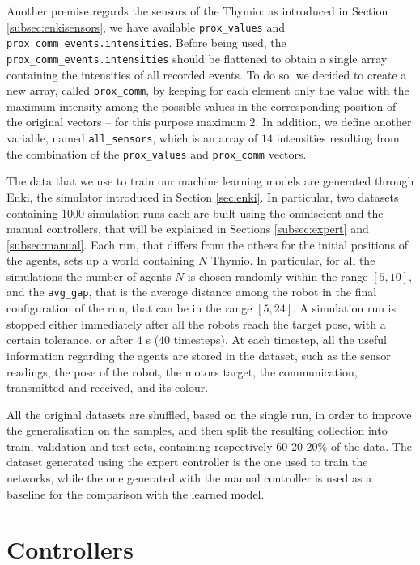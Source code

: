 Another premise regards the sensors of the Thymio: as introduced in Section 
\ref{subsec:enkisensors}, we have available \texttt{prox\_values} and 
\texttt{prox\_comm\_events.intensities}. Before being used, the 
\texttt{prox\_comm\_events.intensities} should be flattened to obtain a single 
array containing the intensities of all recorded events. 
To do so, we decided to create a new array, called \texttt{prox\_comm}, by 
keeping for each element only the value with the maximum intensity among the 
possible values in the corresponding position of the original vectors – for this 
purpose maximum $2$.
In addition, we define another variable, named \texttt{all\_sensors}, which is an 
array of $14$ intensities resulting from the combination of the 
\texttt{prox\_values} and \texttt{prox\_comm} vectors.

The data that we use to train our machine learning models are generated through 
Enki, the simulator introduced in Section \ref{sec:enki}.
In particular, two datasets containing $1000$ simulation runs each are built using 
the omniscient and the manual controllers, that will be explained in Sections 
\ref{subsec:expert} and \ref{subsec:manual}. 
Each run, that differs from the others for the initial positions of the agents, sets up 
a world containing $N$ Thymio. 
In particular, for all the simulations the number of agents $N$ is chosen randomly 
within the range $[5, 10]$, and the \texttt{avg\_gap}, that is the average distance 
among the robot in the final configuration of the run, that can be in the range 
$[5, 24]$.
A simulation run is stopped either immediately after all the robots reach the 
target pose, with a certain tolerance, or after $4$ \gls{s} ($40$ timesteps).
At each timestep, all the useful information regarding the agents are stored in the 
dataset, such as the sensor readings, the pose of the robot, the motors target, the 
communication, transmitted and received, and its colour.

All the original datasets are shuffled, based on the single run, in order to improve 
the generalisation on the samples, and then split the resulting collection into 
train, validation and test sets, containing respectively 60-20-20\% of the data.
The dataset generated using the expert controller is the one used to train the 
networks, while the one generated with the manual controller is used as a 
baseline for the comparison with the learned model.

\section{Controllers}
\label{sec:controllersmodel}

